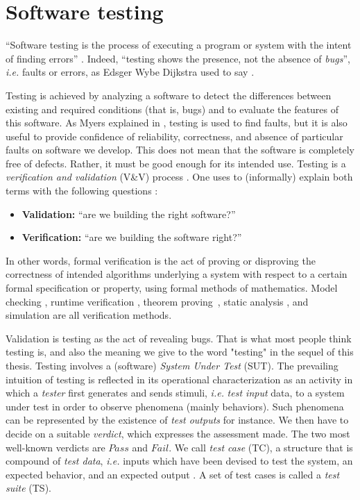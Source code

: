 \section{Software testing}
\label{sec:related:testing}

\enquote{Software testing is the process of executing a program
or system with the intent of finding errors}
\cite{Myers:1979:AST:539883}.  Indeed, \enquote{testing shows the
presence, not the absence of \emph{bugs}}, \emph{i.e.} faults or
errors, as Edsger Wybe Dijkstra used to say
\cite{Buxton:1970:SET:1102021}.

Testing is achieved by analyzing a software to detect the
differences between existing and required conditions (that is,
bugs) and to evaluate the features of this software. As Myers
explained in \cite{Myers:1979:AST:539883}, testing is used to
find faults, but it is also useful to provide confidence of
reliability, correctness, and absence of particular faults on
software we develop. This does not mean that the software is
completely free of defects. Rather, it must be good enough for
its intended use. Testing is a \emph{verification and validation}
(V\&V) process \cite{wallace1989software}. One uses to
(informally) explain both terms with the following questions
\cite{Boehm1979}:

\begin{itemize}
    \item \textbf{Validation:} \enquote{are we building the right
        software?}
    \item \textbf{Verification:} \enquote{are we building the
        software right?}
\end{itemize}

In other words, formal verification is the act of proving or
disproving the correctness of intended algorithms underlying a
system with respect to a certain formal specification or
property, using formal methods of mathematics. Model checking
\cite{clarke1999model}, runtime verification
\cite{Leucker2009293}, theorem proving\ \cite{fitting2012first},
static analysis \cite{lev2000putting}, and simulation are all
verification methods.

Validation is testing as the act of revealing bugs. That is what
most people think testing is, and also the meaning we give to the
word "testing" in the sequel of this thesis. Testing involves a
(software) \textit{System Under Test} (SUT). The prevailing
intuition of testing is reflected in its operational
characterization as an activity in which a \textit{tester} first
generates and sends stimuli, \emph{i.e.} \textit{test input}
data, to a system under test in order to observe phenomena
(mainly behaviors). Such phenomena can be represented by the
existence of \textit{test outputs} for instance. We then have to
decide on a suitable \textit{verdict}, which expresses the
assessment made. The two most well-known verdicts are $Pass$ and
$Fail$. We call \textit{test case} (TC), a structure that is
compound of \textit{test data}, \emph{i.e.}  inputs which have
been devised to test the system, an expected behavior, and an
expected output \cite{5733835}. A set of test cases is called a
\textit{test suite} (TS).

